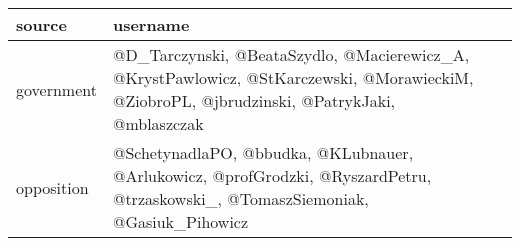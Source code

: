\begin{tabular}{lp{1.8cm}p{5cm}}
\toprule
     source &                                                                                                                                      username \\
\midrule
 government &  @D\_Tarczynski, @BeataSzydlo, @Macierewicz\_A, @KrystPawlowicz, @StKarczewski, @MorawieckiM, @ZiobroPL, @jbrudzinski, @PatrykJaki, @mblaszczak \\
 opposition &              @SchetynadlaPO, @bbudka, @KLubnauer, @Arlukowicz, @profGrodzki, @RyszardPetru, @trzaskowski\_, @TomaszSiemoniak, @Gasiuk\_Pihowicz \\
\bottomrule
\end{tabular}
